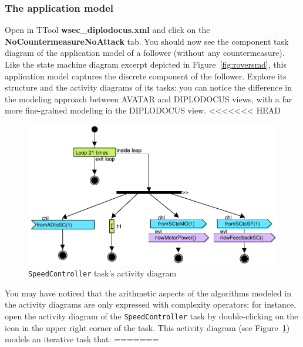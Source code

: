 \documentclass{article}
\begin{document}
\subsubsection{The application model}

Open in TTool \textbf{wsec\_diplodocus.xml} and click on the \textbf{NoCountermeasureNoAttack} tab. You should now see the component task diagram of the application model of a follower (without any countermeasure). Like the state machine diagram excerpt depicted in Figure~\ref{fig:roversmd}, this application model captures the discrete component of the follower. Explore its structure and the activity diagrams of its tasks: you can notice the difference in the modeling approach between AVATAR and DIPLODOCUS views, with a far more fine-grained modeling in the DIPLODOCUS view.
<<<<<<< HEAD

\begin{figure}
	\centering
	\includegraphics[width=.75\textwidth]{figures/execi.pdf}
	\caption{\texttt{SpeedController} task's activity diagram}
	\label{fig:ad}
\end{figure}

You may have noticed that the arithmetic aspects of the algorithms modeled in the activity diagrams are only expressed with complexity operators: for instance, open the activity diagram of the \texttt{SpeedController} task by double-clicking on the icon in the upper right corner of the task. This activity diagram (see Figure~\ref{fig:ad}) models an iterative task that:
=======
\end{document}
